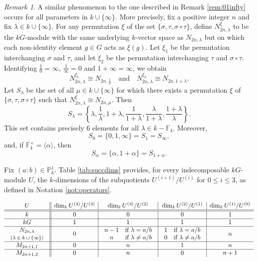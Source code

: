 \documentclass{amsart}
\numberwithin{equation}{section}
\numberwithin{table}{section}
\theoremstyle{plain}
\theoremstyle{definition}
\theoremstyle{remark}
\newtheorem{remark}[theorem]{Remark}
\begin{document}
\begin{remark}
\label{rem:cohorts}
A similar phenomenon to the one described in Remark \ref{rem:01infty} occurs for all parameters in $k\cup \{\infty\}$. More precisely, fix a positive integer $n$ and fix $\lambda \in k\cup \{\infty\}$. For any permutation $\xi$ of the set $\{\sigma,\tau,\sigma\circ\tau\}$, define $N_{2n,\lambda}^\xi$ to be the $kG$-module with the same underlying $k$-vector space as $N_{2n,\lambda}$ but on which each non-identity element $g\in G$ acts as $\xi(g)$. Let $\xi_1$ be the permutation interchanging $\sigma$ and $\tau$, and let $\xi_2$ be the permutation interchanging $\tau$ and $\sigma\circ \tau$. Identifying $\frac{1}{0}=\infty$, $\frac{1}{\infty}=0$ and $1+\infty = \infty$, we obtain
$$N_{2n,\lambda}^{\xi_1} \cong N_{2n,\frac{1}{\lambda}}\quad\mbox{and}\quad
N_{2n,\lambda}^{\xi_2} \cong N_{2n,1+\lambda}.$$
Let $S_\lambda$ be the set of all $\mu\in k\cup\{\infty\}$ for which there exists a permutation $\xi$ of $\{\sigma,\tau,\sigma\circ\tau\}$ such that $N_{2n,\lambda}^{\xi}\cong N_{2n,\mu}$. Then 
$$S_\lambda=\left\{\lambda,\frac{1}{\lambda},1+\lambda,\frac{1}{1+\lambda},\frac{\lambda}{1+\lambda},\frac{1+\lambda}{\lambda}\right\}.$$
This set contains precisely 6 elements for all $\lambda\in k-\mathbb{F}_4$. Moreover, 
$$S_0=\{0,1,\infty\} = S_1 = S_\infty,$$
and, if $\mathbb{F}_4^\times = \langle \alpha \rangle$, then 
$$S_{\alpha}=\{\alpha,1+\alpha\} = S_{1+\alpha}.$$
\end{remark}

Fix $(a:b)\in \mathbb{P}^1_k$. Table \ref{tab:succdims} provides, for every indecomposable $kG$-module $U$, the $k$-dimensions of the subquotients $U^{(i+1)}/U^{(i)}$ for $0\le i \le 3$, as defined in Notation \ref{not:operators}.
\begin{table}[ht]
\caption{Dimensions of successive subquotients of indecomposable $kG$-modules.}
\label{tab:succdims}
$\begin{array}{c||c|c|c|c}
U&\mathrm{dim}_k\,U^{(4)}/U^{(3)}&\mathrm{dim}_k\,U^{(3)}/U^{(2)}&\mathrm{dim}_k\,U^{(2)}/U^{(1)}&\mathrm{dim}_k\,U^{(1)}/U^{(0)} \\ \hline\hline
k&0&0&0&1\\ \hline
kG&1&1&1&1 \\ \hline
\begin{array}{c} N_{2n,\lambda}\\\mbox{\footnotesize $(\lambda\in k\cup\{\infty\})$}\end{array}&0&\begin{array}{cl} n-1 & \mbox{if $\lambda =a/b$}\\
n & \mbox{if $\lambda\ne a/b$}\end{array} & \begin{array}{cl} 1 & \mbox{if $\lambda = a/b$}\\
0 & \mbox{if $\lambda \ne a/b$}\end{array} & n \\ \hline
M_{2n+1,1}&0&n&1&n\\ \hline
M_{2n+1,2}&0&n&0&n+1
\end{array}$
\end{table}
\end{document}
